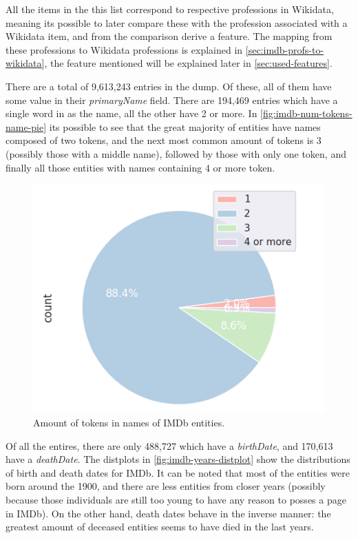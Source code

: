 \documentclass[epsfig,a4paper,11pt,titlepage,twoside,openany]{book}
\begin{document}
All the items in the this list correspond to respective professions in Wikidata, meaning its possible to later compare these with the profession associated with a Wikidata item, and from the comparison derive a feature. The mapping from these professions to Wikidata professions is explained in \autoref{sec:imdb-profs-to-wikidata}, the feature mentioned will be explained later in \autoref{sec:used-features}.

There are a total of 9,613,243 entries in the dump. Of these, all of them have some value in their \textit{primaryName} field. There are 194,469 entries which have a single word in as the name, all the other have 2 or more. In \autoref{fig:imdb-num-tokens-name-pie} its possible to see that the great majority of entities have names composed of two tokens, and the next most common amount of tokens is 3 (possibly those with a middle name), followed by those with only one token, and finally all those entities with names containing 4 or more token.

\begin{figure}[]
  \centering \includegraphics[width=.6\textwidth]{imdb_num_tokens_names}
  \caption{Amount of tokens in names of IMDb entities.}
  \label{fig:imdb-num-tokens-name-pie}
\end{figure}


Of all the entires, there are only 488,727 which have a \textit{birthDate}, and 170,613 have a \textit{deathDate}. The distplots in \autoref{fig:imdb-years-distplot} show the distributions of birth and death dates for IMDb. It can be noted that most of the entities were born around the 1900, and there are less entities from closer years (possibly because those individuals are still too young to have any reason to posses a page in IMDb). On the other hand, death dates behave in the inverse manner: the greatest amount of deceased entities seems to have died in the last years.
\end{document}
